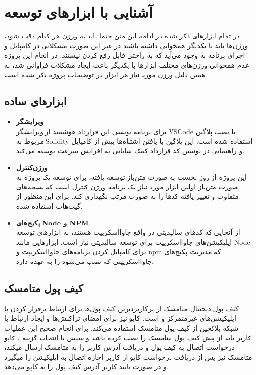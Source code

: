 \chapter{آشنایی با ابزار‌های توسعه}
در تمام ابزارهای ذکر شده در ادامه این متن حتما باید به ورژن هر کدام دقت شود، ورژن‌ها باید با یکدیگر همخوانی داشته باشند در غیر این صورت مشکلاتی در کامپایل و اجرای برنامه به وجود می‌آید که به راحتی قابل رفع کردن نیستند. در انجام این پروژه عدم همخوانی ورژن‌های مختلف ابزارها با یکدیگر باعث ایجاد مشکلات فراوانی شد، به همین دلیل ورژن مورد نیاز هر ابزار در توضیحات پروژه ذکر شده است.

\section{ابزارهای ساده}
\begin{itemize}
	\item \textbf{ویرایشگر}\\
	برای برنامه نویسی این قرارداد هوشمند از ویرایشگر VSCode با نصب
	پلاگین مربوط به Solidity
استفاده شده است. این پلاگین با یافتن اشتباه‌ها پیش از کامپایل و راهنمایی در نوشتن کد قرارداد کمک شایانی به افزایش سرعت توسعه می‌کند.

	\item \textbf{ورژن‌کنترل}\\
	این پروژه از روز نخست به صورت متن‌باز توسعه یافته، برای توسعه یک پروژه به صورت متن‌باز اولین ابزار مورد نیاز یک برنامه ورژن کنترل است که نسخه‌های متفاوت و تغییر یافته کدها را به صورت مرتب نگهداری کند. برای این منظور از گیت‌هاب استفاده شده.

	\item \textbf{پکیج‌های Node و NPM}\\
از آنجایی که کدهای سالیدیتی در واقع جاوا‌اسکریپت هستند، به ابزارهای توسعه اپلیکیشن‌های جاوااسکریپت برای توسعه سالیدیتی نیاز است. ابزارهایی مانند Node برای کامپایل کردن برنامه‌های جاوااسکریپت و npm که مدیریت پکیج‌های جاوااسکریپتی که نصب می‌شود را به عهده دارد.

\end{itemize}


\section{کیف پول متامسک}
کیف پول دیجیتال متامسک از پرکاربردترین کیف پول‌ها برای ارتباط برقرار کردن با اپلیکیشن‌های غیرمتمرکز و
است.
کاپو نیز برای امضای تراکنش‌ها و ایجاد ارتباط با شبکه بلاکچین از کیف پول متامسک استفاده می‌کند. برای انجام صحیح این عملیات کاربر باید از پیش کیف پول متامسک را نصب کرده باشد و سپس با انتخاب گزینه
،
کاپو درخواست اتصال به کیف پول و دریافت آدرس کاربر را به متامسک ارسال میکند، متامسک نیز پس از دریافت درخواست کاپو از کاربر اجازه اتصال به اپلیکیشن را میگیرد و در صورت تایید کاربر آدرس کیف پول را به کاپو می‌دهد.

